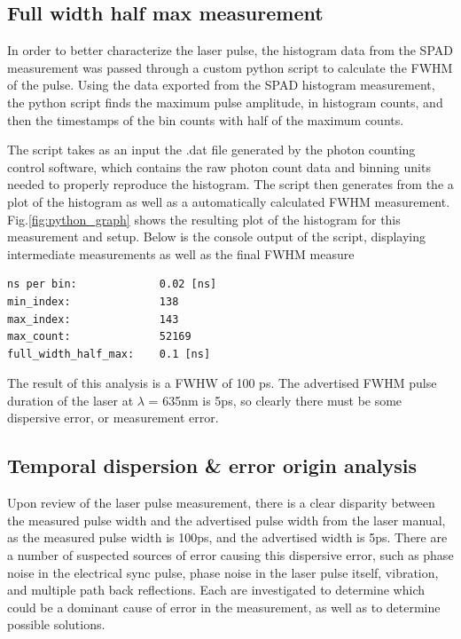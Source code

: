 \documentclass[a4paper]{article}
\begin{document}
\subsection{Full width half max measurement}

In order to better characterize the laser pulse, the histogram data from the SPAD measurement was passed through a custom python script to calculate the FWHM of the pulse.
Using the data exported from the SPAD histogram measurement, the python script finds the maximum pulse amplitude, in histogram counts, and then the timestamps of the bin counts with half of the maximum counts.

The script takes as an input the .dat file generated by the photon counting control software, which contains the raw photon count data and binning units needed to properly reproduce the histogram. The script then generates from the a plot of the histogram as well as a automatically calculated FWHM measurement. Fig.\ref{fig:python_graph} shows the resulting plot of the histogram for this measurement and setup. Below is the console output of the script, displaying intermediate measurements as well as the final FWHM measure

\begin{verbatim}
ns per bin:             0.02 [ns]
min_index:              138
max_index:              143
max_count:              52169
full_width_half_max:    0.1 [ns]
\end{verbatim}

The result of this analysis is a FWHW of 100 ps. The advertised FWHM pulse duration of the laser at \(\lambda\) = 635nm is 5ps, so clearly there must be some dispersive error, or measurement error.

\subsection{Temporal dispersion \& error origin analysis}

Upon review of the laser pulse measurement, there is a clear disparity between the measured pulse width and the advertised pulse width from the laser manual, as the measured pulse width is 100ps, and the advertised width is 5ps. There are a number of suspected sources of error causing this dispersive error, such as phase noise in the electrical sync pulse, phase noise in the laser pulse itself, vibration, and multiple path back reflections. Each are investigated to determine which could be a dominant cause of error in the measurement, as well as to determine possible solutions.
\newline
\end{document}
